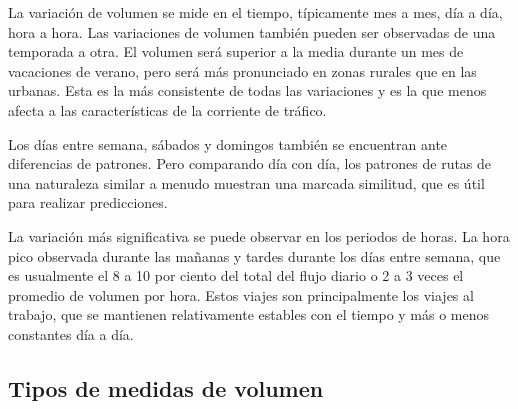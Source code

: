 La variación de volumen se mide en el tiempo, típicamente mes a mes, día a día, hora a hora. Las variaciones de volumen también pueden ser observadas de una temporada a otra. El volumen será superior a la media durante un mes de vacaciones de verano, pero será más pronunciado en zonas rurales que en las urbanas. Esta es la más consistente de todas las variaciones y es la que menos afecta a las características de la corriente de tráfico.

Los días entre semana, sábados y domingos también se encuentran ante diferencias de patrones. Pero comparando día con día, los patrones de rutas de una naturaleza similar a menudo muestran una marcada similitud, que es útil para realizar predicciones.

La variación más significativa se puede observar en los periodos de horas. La hora pico observada durante las mañanas y tardes durante los días entre semana, que es usualmente el 8 a 10 por ciento del total del flujo diario o 2 a 3 veces el promedio de volumen por hora. Estos viajes son principalmente los viajes al trabajo, que se mantienen relativamente estables con el tiempo y más o menos constantes día a día.

\subsection{Tipos de medidas de volumen}

